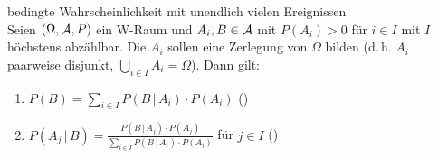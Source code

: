 \begin{Satz}{bedingte Wahrscheinlichkeit mit unendlich vielen Ereignissen}\\
    Seien $(\Omega, \mathcal{A}, P)$ ein W-Raum und $A_i, B \in \mathcal{A}$ mit $P(A_i) > 0$ für $i \in I$
    mit $I$ höchstens abzählbar.
    Die $A_i$ sollen eine Zerlegung von $\Omega$ bilden
    (d.\,h. $A_i$ paarweise disjunkt, $\bigcup_{i \in I} A_i = \Omega$).
    Dann gilt:
    \begin{enumerate}
        \item
        $P(B) = \sum_{i \in I} P(B \,|\, A_i) \cdot P(A_i)$
        ()
        
        \item
        $P(A_j \,|\, B) = \frac{P(B \,|\, A_j) \cdot P(A_j)}
        {\sum_{i \in I} P(B \,|\, A_i) \cdot P(A_i)}$ für $j \in I$
        ()
    \end{enumerate}
\end{Satz}

\linie
\pagebreak

